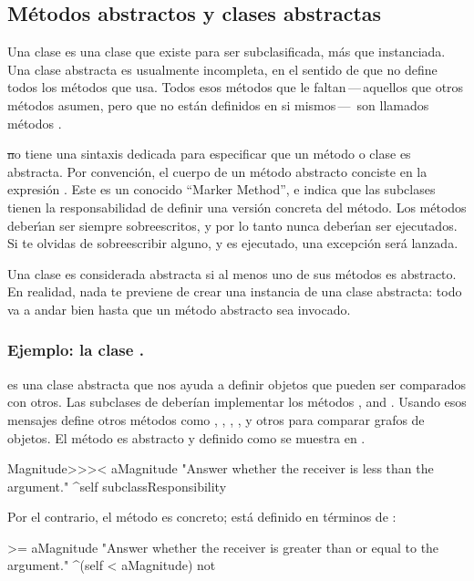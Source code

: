 \documentclass[a4paper,10pt,twoside]{book}
\begin{document}

\subsection{M\'etodos abstractos y clases abstractas}

Una clase   es una clase que existe para ser subclasificada, m\'as que instanciada. 
Una clase abstracta es usualmente incompleta, en el sentido de que no define todos los m\'etodos que usa. 
Todos esos m\'etodos que le faltan\,---\,aquellos que otros m\'etodos asumen, pero que no est\'an definidos en si mismos\,---\, son llamados m\'etodos . 


\st no tiene una sintaxis dedicada para especificar que un m\'etodo o clase es abstracta. 
Por convenci\'on, el cuerpo de un m\'etodo abstracto conciste en la expresi\'on \mbox{.} 
Este es un conocido ``Marker Method'', e indica que las subclases tienen la responsabilidad de definir una versi\'on concreta del m\'etodo.
Los m\'etodos  deber\'\i{}an ser siempre sobreescritos, y por lo tanto nunca deber\'\i{}an ser ejecutados.
Si te olvidas de sobreescribir alguno, y es ejecutado, una excepci\'on ser\'a lanzada. 


Una clase es considerada abstracta si al menos uno de sus m\'etodos es abstracto.
En realidad, nada te previene de crear una instancia de una clase abstracta: todo va a andar bien hasta que un m\'etodo abstracto sea invocado. 

\subsubsection{Ejemplo: la clase .}
%
%
 es una clase abstracta que nos ayuda a definir objetos que pueden ser comparados con otros. Las subclases de  deber\'ian implementar los m\'etodos \ct{<}, \ct{=} and . Usando esos mensajes  define otros m\'etodos como \ct{>}, \ct{>=}, \ct{<=}, ,   y otros para comparar grafos de objetos.  El m\'etodo    es abstracto y definido como se muestra en  .
%
\begin{method}[MagnitudeLessThan]{}
Magnitude>>>< aMagnitude 
	"Answer whether the receiver is less than the argument."
	^self subclassResponsibility
\end{method}
%
\noindent
Por el contrario, el m\'etodo  es concreto; est\'a definido en t\'erminos de \ct{<}:
%
%
\begin{method}[Magnitude>=]{}
>= aMagnitude 
	"Answer whether the receiver is greater than or equal to the argument."
	^(self < aMagnitude) not
\end{method}
\end{document}
